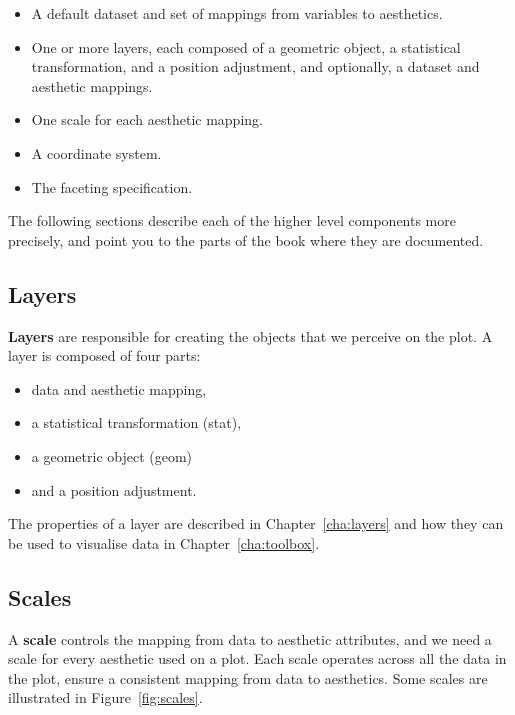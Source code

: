\begin{itemize}
  \item A default dataset and set of mappings from variables to aesthetics.
  \item One or more layers, each composed of a geometric object, a statistical transformation, and a position adjustment, and optionally, a dataset and aesthetic mappings.
  \item One scale for each aesthetic mapping.
  \item A coordinate system.
  \item The faceting specification.
\end{itemize}

The following sections describe each of the higher level components more precisely, and point you to the parts of the book where they are documented.

\subsection{Layers}

\textbf{Layers} are responsible for creating the objects that we perceive on the plot.  A layer is composed of four parts:  

\begin{itemize}
  \item data and aesthetic mapping,
  \item a statistical transformation (stat), 
  \item a geometric object (geom)
  \item and a position adjustment.
\end{itemize}

\noindent The properties of a layer are described in Chapter~\ref{cha:layers} and how they can be used to visualise data in Chapter~\ref{cha:toolbox}.

\subsection{Scales}\label{sec:scales}

A {\bf scale} controls the mapping from data to aesthetic attributes, and we need a scale for every aesthetic used on a plot.  Each scale operates across all the data in the plot, ensure a consistent mapping from data to aesthetics.  Some scales are illustrated in Figure~\ref{fig:scales}.

% 


